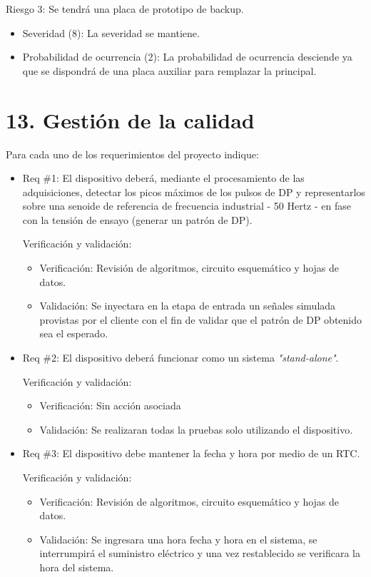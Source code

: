 \documentclass[11pt]{charter}
\begin{document}
Riesgo 3: Se tendrá una placa de prototipo de backup.
\begin{itemize}  
\item Severidad (8): La severidad se mantiene.
\item Probabilidad de ocurrencia (2): La probabilidad de ocurrencia desciende ya que se dispondrá de una placa auxiliar para remplazar la principal.
\end{itemize}


\section{13. Gestión de la calidad}
\label{sec:calidad}

Para cada uno de los requerimientos del proyecto indique:
\begin{itemize} 
\item Req \#1: El dispositivo deberá, mediante el procesamiento de las adquisiciones, detectar los picos máximos de los pulsos de DP y representarlos sobre una senoide de referencia de frecuencia industrial - 50 Hertz - en fase con la tensión de ensayo (generar un patrón de DP).

Verificación y validación:

\begin{itemize}
\item Verificación: Revisión de algoritmos, circuito esquemático y hojas de datos.
\item Validación: Se inyectara en la etapa de entrada un señales simulada provistas por el cliente con el fin de validar que el patrón de DP obtenido sea el esperado.
\end{itemize}

\item Req \#2: El dispositivo deberá funcionar como un sistema \textit{"stand-alone"}.

Verificación y validación:

\begin{itemize}
\item Verificación: Sin acción asociada
\item Validación: Se realizaran todas la pruebas solo utilizando el dispositivo.
\end{itemize}

\item Req \#3: El dispositivo debe mantener la fecha y hora por medio de un RTC.

Verificación y validación:

\begin{itemize}
\item Verificación: Revisión de algoritmos, circuito esquemático y hojas de datos.
\item Validación: Se ingresara una hora fecha y hora en el sistema, se interrumpirá el suministro eléctrico y una vez restablecido se verificara la hora del sistema.
\end{itemize}


\end{itemize}
\end{document}
